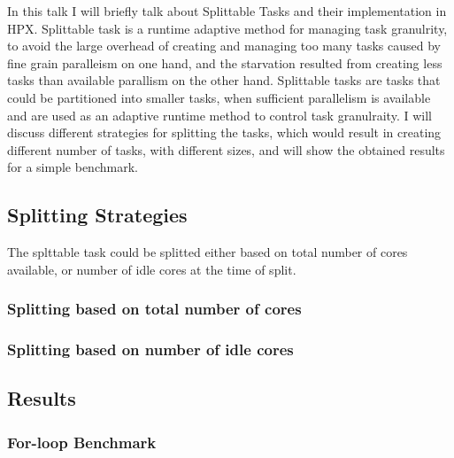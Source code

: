 In this talk I will briefly talk about Splittable Tasks and their implementation in HPX. Splittable task is a runtime adaptive method for managing task granulrity, to avoid the large overhead of creating and managing too many tasks caused by fine grain paralleism on one hand, and the starvation resulted from creating less tasks than available parallism on the other hand. Splittable tasks are tasks that could be partitioned into smaller tasks, when sufficient parallelism is available and are used as an adaptive runtime method to control task granulraity. I will discuss different strategies for splitting the tasks, which would result in creating different number of tasks, with different sizes, and will show the obtained results for a simple benchmark.   
 
\subsection{Splitting Strategies}
The splttable task could be splitted either based on total number of cores available, or number of idle cores at the time of split. 

\subsubsection{Splitting based on total number of cores}

\subsubsection{Splitting based on number of idle cores}

\subsection{Results}

\subsubsection{For-loop Benchmark}

